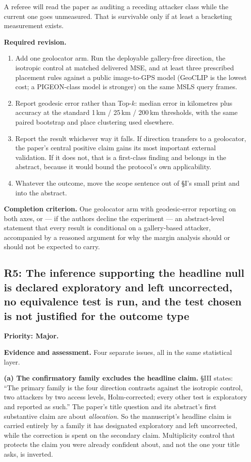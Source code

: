 \documentclass[11pt,a4paper]{article}
\newcommand{\finding}[3]{\subsection{#1: #3}\label{rev:#1}\textbf{Priority: #2.}}
\newcommand{\evidence}{\par\textbf{Evidence and assessment.} }
\newcommand{\action}{\par\textbf{Required revision.} }
\newcommand{\acceptance}{\par\textbf{Completion criterion.} }
\begin{document}
A referee will read the paper as auditing a receding attacker class while the
current one goes unmeasured. That is survivable only if at least a bracketing
measurement exists.

\action
\begin{enumerate}
\item Add one geolocator arm. Run the deployable gallery-free direction, the
  isotropic control at matched delivered MSE, and at least three prescribed
  placement rules against a public image-to-GPS model (GeoCLIP is the lowest
  cost; a PIGEON-class model is stronger) on the same MSLS query frames.
\item Report geodesic error rather than Top-$k$: median error in kilometres
  plus accuracy at the standard 1\,km / 25\,km / 200\,km thresholds, with the
  same paired bootstrap and place clustering used elsewhere.
\item Report the result whichever way it falls. If direction transfers to a
  geolocator, the paper's central positive claim gains its most important
  external validation. If it does not, that is a first-class finding and
  belongs in the abstract, because it would bound the protocol's own
  applicability.
\item Whatever the outcome, move the scope sentence out of \S I's small print
  and into the abstract.
\end{enumerate}

\acceptance
One geolocator arm with geodesic-error reporting on both axes, or --- if the
authors decline the experiment --- an abstract-level statement that every
result is conditional on a gallery-based attacker, accompanied by a reasoned
argument for why the margin analysis should or should not be expected to carry.

\finding{R5}{Major}{The inference supporting the headline null is declared
exploratory and left uncorrected, no equivalence test is run, and the test
chosen is not justified for the outcome type}

\evidence
Four separate issues, all in the same statistical layer.

\textbf{(a) The confirmatory family excludes the headline claim.} \S III
states: ``The primary family is the four direction contrasts against the
isotropic control, two attackers by two access levels, Holm-corrected; every
other test is exploratory and reported as such.'' The paper's title question and
its abstract's first substantive claim are about \emph{allocation}. So the
manuscript's headline claim is carried entirely by a family it has designated
exploratory and left uncorrected, while the correction is spent on the
secondary claim. Multiplicity control that protects the claim you were already
confident about, and not the one your title asks, is inverted.
\end{document}

